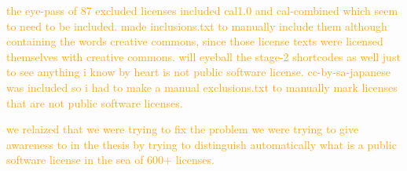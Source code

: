\textcolor{orange}{the eye-pass of 87 excluded licenses included cal1.0 and cal-combined which seem to need to be included. made inclusions.txt to manually include them although containing the words creative commons, since those license texts were licensed themselves with creative commons. will eyeball the stage-2 shortcodes as well just to see anything i know by heart is not public software license. cc-by-sa-japanese was included so i had to make a manual exclusions.txt to manually mark licenses that are not public software licenses.}

\textcolor{orange}{we relaized that we were trying to fix the problem we were trying to give awareness to in the thesis by trying to distinguish automatically what is a public software license in the sea of 600+ licenses.}